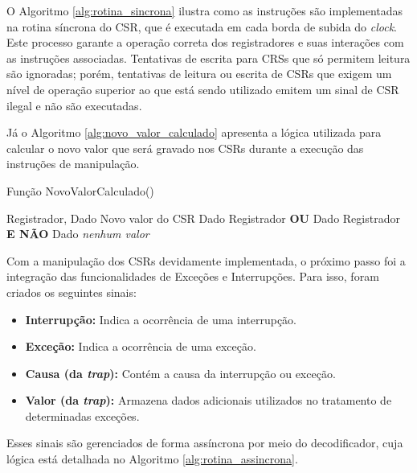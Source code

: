 \documentclass[
	12pt,				%
	openright,			%
	oneside,			%
	a4paper,			%
	english,			%
	french,				%
	spanish,			%
	brazil,				%
	]{abntex2}
\begin{document}
O Algoritmo \ref{alg:rotina_sincrona} ilustra como as instruções são implementadas na rotina síncrona do CSR, que é executada em cada borda de subida do \textit{clock}. Este processo garante a operação correta dos registradores e suas interações com as instruções associadas. Tentativas de escrita para CRSs que só permitem leitura são ignoradas; porém, tentativas de leitura ou escrita de CSRs que exigem um nível de operação superior ao que está sendo utilizado emitem um sinal de CSR ilegal e não são executadas.

Já o Algoritmo \ref{alg:novo_valor_calculado} apresenta a lógica utilizada para calcular o novo valor que será gravado nos CSRs durante a execução das instruções de manipulação.

\begin{algorithm}[h!]
\caption{Função NovoValorCalculado()}
\label{alg:novo_valor_calculado}
\begin{algorithmic}[1]
    \REQUIRE Registrador, Dado
    \ENSURE Novo valor do CSR
        \RETURN Dado
        \RETURN Registrador \textbf{OU} Dado
        \RETURN Registrador \textbf{E NÃO} Dado
    \ELSE
        \RETURN \textit{nenhum valor}
    \ENDIF
\end{algorithmic}
\end{algorithm}

Com a manipulação dos CSRs devidamente implementada, o próximo passo foi a integração das funcionalidades de Exceções e Interrupções. Para isso, foram criados os seguintes sinais:

\begin{itemize}
    \item \textbf{Interrupção:} Indica a ocorrência de uma interrupção.
    \item \textbf{Exceção:} Indica a ocorrência de uma exceção.
    \item \textbf{Causa (da \textit{trap}):} Contém a causa da interrupção ou exceção.
    \item \textbf{Valor (da \textit{trap}):} Armazena dados adicionais utilizados no tratamento de determinadas exceções.
\end{itemize}

Esses sinais são gerenciados de forma assíncrona por meio do decodificador, cuja lógica está detalhada no Algoritmo \ref{alg:rotina_assincrona}. 
\end{document}

